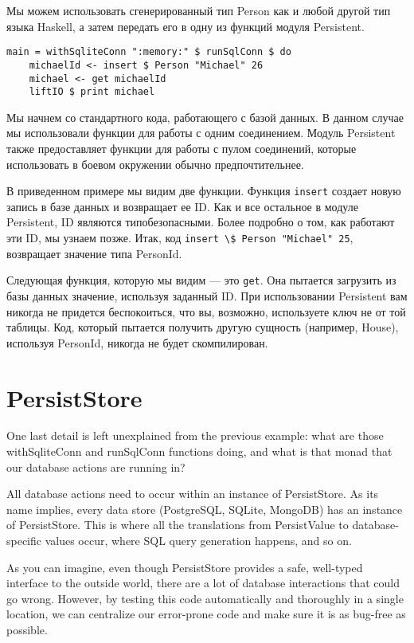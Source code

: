 Мы можем использовать сгенерированный тип Person как и любой другой тип языка Haskell, а затем передать его в одну из функций модуля Persistent.

\begin{lstlisting}
main = withSqliteConn ":memory:" $ runSqlConn $ do
    michaelId <- insert $ Person "Michael" 26
    michael <- get michaelId
    liftIO $ print michael
\end{lstlisting}%

Мы начнем со стандартного кода, работающего с базой данных. В данном случае мы использовали функции для работы с одним соединением. Модуль Persistent также предоставляет функции для работы с пулом соединений, которые использовать в боевом окружении обычно предпочтительнее.

В приведенном примере мы видим две функции. Функция \lstinline'insert' создает новую запись в базе данных и возвращает ее ID. Как и все остальное в модуле Persistent, ID являются типобезопасными. Более подробно о том, как работают эти ID, мы узнаем позже. Итак, код \lstinline'insert \$ Person "Michael" 25', возвращает значение типа PersonId.

Следующая функция, которую мы видим --- это \lstinline'get'. Она пытается загрузить из базы данных значение, используя заданный ID. При использовании Persistent вам никогда не придется беспокоиться, что вы, возможно, используете ключ не от той таблицы. Код, который пытается получить другую сущность (например, House), используя PersonId, никогда не будет скомпилирован.

\section{PersistStore}

One last detail is left unexplained from the previous example: what are those withSqliteConn and runSqlConn functions doing, and what is that monad that our database actions are running in?

All database actions need to occur within an instance of PersistStore. As its name implies, every data store (PostgreSQL, SQLite, MongoDB) has an instance of PersistStore. This is where all the translations from PersistValue to database-specific values occur, where SQL query generation happens, and so on.

As you can imagine, even though PersistStore provides a safe, well-typed interface to the outside world, there are a lot of database interactions that could go wrong. However, by testing this code automatically and thoroughly in a single location, we can centralize our error-prone code and make sure it is as bug-free as possible.

